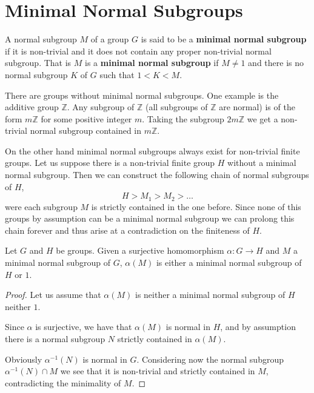 \pagebreak

\section{Minimal Normal Subgroups}

\begin{definition}
A normal subgroup $M$ of a group $G$ is said to be a \textbf{minimal normal subgroup} if it is non-trivial and it does not contain any proper non-trivial normal subgroup. That is $M$ is a \textbf{minimal normal subgroup} if $M \ne 1$ and there is no normal subgroup $K$ of $G$ such that $1 < K < M$. 
\end{definition}

There are groups without minimal normal subgroups. One example is the additive group $\mathbb{Z}$. Any subgroup of $\mathbb{Z}$ (all subgroups of $\mathbb{Z}$ are normal) is of the form $m\mathbb{Z}$ for some positive integer $m$. Taking the subgroup $2m\mathbb{Z}$ we get a non-trivial normal subgroup contained in $m\mathbb{Z}$.

On the other hand minimal normal subgroups always exist for non-trivial finite groups. 
Let us suppose there is a non-trivial finite group $H$ without a minimal normal subgroup. Then we can construct the following chain of normal subgroups of $H$,
$$
H > M_1 > M_2 > \ldots 
$$
were each subgroup $M$ is strictly contained in the one before. Since none of this groups by assumption can be a minimal normal subgroup we can prolong this chain forever and thus arise at a contradiction on the finiteness of $H$.

\begin{theorem}
    \label{hommnsub}
    Let $G$ and $H$ be groups.
    Given a surjective homomorphism $\alpha\colon G \rightarrow H$ and $M$ a minimal normal subgroup of $G$, $\alpha(M)$ is either a minimal normal subgroup of $H$ or $1$.
\end{theorem}
\begin{proof}
    Let us assume that $\alpha(M)$ is neither a minimal normal subgroup of $H$ neither $1$.

    Since $\alpha$ is surjective, we have that $\alpha(M)$ is normal in $H$, and by assumption there is a normal subgroup $N$ strictly contained in $\alpha(M)$.
    
    Obviously $\alpha^{-1}(N)$ is normal in $G$. Considering now the normal subgroup $\alpha^{-1}(N) \cap M$ we see that it is non-trivial and strictly contained in $M$, contradicting the minimality of $M$.
\end{proof}

